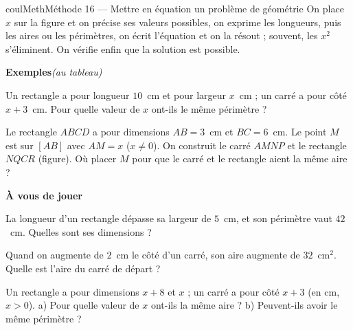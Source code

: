 \documentclass[11pt,a4paper]{article}
\makeatletter
\newcounter{lycee@signet}
\newcommand{\signet}[3][]{\stepcounter{lycee@signet}%
  \edef\lycee@dest{\if\relax\detokenize{#1}\relax
    signet.\arabic{lycee@signet}\else#1\fi}%
  \hypertarget{\lycee@dest}{}\bookmark[level=#2,dest=\lycee@dest]{#3}}
\newcounter{methode}
\newenvironment{methodebox}[1][Méthode]{\stepcounter{methode}%
  \begin{boitecours}[phantom={\signet[methode-\arabic{methode}]{2}{#1}}]{coulMeth}{#1}}%
  {\end{boitecours}}
\newcommand{\etape}[1]{\par\smallskip\textbf{\color{coulMeth}#1}\par\nobreak\smallskip}
\newcommand{\autableau}{\hfill{\footnotesize\itshape\color{black!45}(au tableau)}}
\newcommand{\etapeexemples}{%
    \par\smallskip\textbf{\color{coulMeth}Exemples}\autableau\par\nobreak\smallskip}
\makeatother
\begin{document}
\begin{methodebox}[Méthode 16 --- Mettre en équation un problème de géométrie]
On place $x$ sur la figure et on précise ses valeurs possibles, on exprime les longueurs,
puis les aires ou les périmètres, on écrit l'équation et on la résout ; souvent, les
$x^{2}$ s'éliminent. On vérifie enfin que la solution est possible.
\etapeexemples
\begin{questions}[label=\alph*)]
  \item Un rectangle a pour longueur $10$~cm et pour largeur $x$~cm ; un carré a pour côté
        $x+3$~cm. Pour quelle valeur de $x$ ont-ils le même périmètre ?
  \item Le rectangle $ABCD$ a pour dimensions $AB=3$~cm et $BC=6$~cm. Le point $M$ est sur
        $[AB]$ avec $AM=x$ ($x\ne 0$). On construit le carré $AMNP$ et le rectangle
        $NQCR$ (figure). Où placer $M$ pour que le carré et le rectangle aient la même
        aire ?
\end{questions}
\begin{center}
\end{center}

\etape{À vous de jouer}
\begin{questions}
  \item La longueur d'un rectangle dépasse sa largeur de $5$~cm, et son périmètre vaut
        $42$~cm. Quelles sont ses dimensions ?
  \item Quand on augmente de $2$~cm le côté d'un carré, son aire augmente de $32$~cm$^{2}$.
        Quelle est l'aire du carré de départ ?
  \item Un rectangle a pour dimensions $x+8$ et $x$ ; un carré a pour côté $x+3$ (en cm,
        $x>0$). a) Pour quelle valeur de $x$ ont-ils la même aire ? b) Peuvent-ils avoir le
        même périmètre ?
\end{questions}

\end{methodebox}
\end{document}
